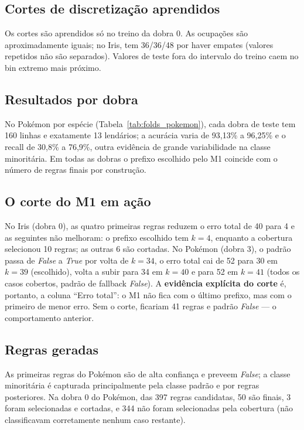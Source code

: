 \documentclass[a4paper,11pt]{article}
\newcommand{\code}[1]{\texttt{\detokenize{#1}}}
\begin{document}
\subsection{Cortes de discretiza\c{c}\~ao aprendidos}


Os cortes s\~ao aprendidos s\'o no treino da dobra 0. As ocupa\c{c}\~oes s\~ao aproximadamente iguais; no Iris, \code{SepalWidthCm} tem 36/36/48 por haver empates (valores repetidos n\~ao s\~ao separados). Valores de teste fora do intervalo do treino caem no bin extremo mais pr\'oximo.

\subsection{Resultados por dobra}

No Pok\'emon por esp\'ecie (Tabela~\ref{tab:folds_pokemon}), cada dobra de teste tem 160 linhas e exatamente 13 lend\'arios; a acur\'acia varia de 93,13\% a 96,25\% e o recall de 30,8\% a 76,9\%, outra evid\^encia de grande variabilidade na classe minorit\'aria. Em todas as dobras o prefixo escolhido pelo M1 coincide com o n\'umero de regras finais por constru\c{c}\~ao.

\subsection{O corte do M1 em a\c{c}\~ao}\label{sec:m1}


No Iris (dobra 0), as quatro primeiras regras reduzem o erro total de 40 para 4 e as seguintes n\~ao melhoram: o prefixo escolhido tem $k=4$, enquanto a cobertura selecionou 10 regras; as outras 6 s\~ao cortadas. No Pok\'emon (dobra 3), o padr\~ao passa de \emph{False} a \emph{True} por volta de $k=34$, o erro total cai de 52 para 30 em $k=39$ (escolhido), volta a subir para 34 em $k=40$ e para 52 em $k=41$ (todos os casos cobertos, padr\~ao de fallback \emph{False}). A \textbf{evid\^encia expl\'icita do corte} \'e, portanto, a coluna ``Erro total'': o M1 n\~ao fica com o \'ultimo prefixo, mas com o primeiro de menor erro. Sem o corte, ficariam 41 regras e padr\~ao \emph{False} --- o comportamento anterior.

\subsection{Regras geradas}


As primeiras regras do Pok\'emon s\~ao de alta confian\c{c}a e preveem \emph{False}; a classe minorit\'aria \'e capturada principalmente pela classe padr\~ao e por regras posteriores. Na dobra 0 do Pok\'emon, das 397 regras candidatas, 50 s\~ao finais, 3 foram selecionadas e cortadas, e 344 n\~ao foram selecionadas pela cobertura (n\~ao classificavam corretamente nenhum caso restante).
\end{document}
